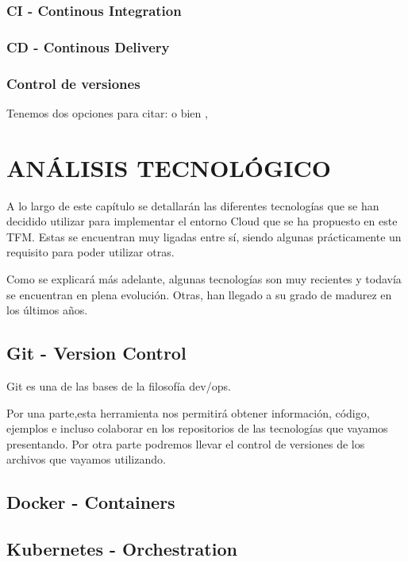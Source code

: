 \documentclass[spanish,twoside,12pt,a4paper]{book}
\begin{document}
\subsection{CI - Continous Integration}
\subsection{CD - Continous Delivery}
\subsection{Control de versiones}


Tenemos dos opciones para citar: \cite{russel03modern} o bien \citep{russel03modern}, 



\chapter{ANÁLISIS TECNOLÓGICO}

A lo largo de este capítulo se detallarán las diferentes tecnologías que se han decidido utilizar para implementar el entorno Cloud que se ha propuesto en este TFM. Estas se encuentran muy ligadas entre sí, siendo algunas prácticamente un requisito para poder utilizar otras. 

Como se explicará más adelante, algunas tecnologías son muy recientes y todavía se encuentran en plena evolución. Otras, han llegado a su grado de madurez en los últimos años.



\section{Git - Version Control}
Git es una de las bases de la filosofía dev/ops. 

Por una parte,esta herramienta nos permitirá obtener información, código, ejemplos e incluso colaborar en los repositorios de las tecnologías que vayamos presentando. Por otra parte podremos llevar el control de versiones de los archivos que vayamos utilizando.

\section{Docker - Containers}

\section{Kubernetes - Orchestration}
\end{document}
